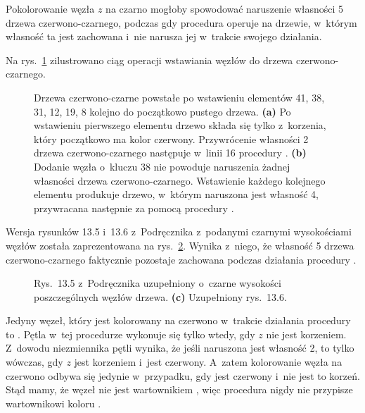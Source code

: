 
\exercise %
Pokolorowanie węzła $z$ na czarno mogłoby spowodować naruszenie własności 5 drzewa czerwono-czarnego, podczas gdy procedura  operuje na drzewie, w~którym własność ta jest zachowana i~nie narusza jej w~trakcie swojego działania.

\exercise %
Na rys.\ \ref{fig:13.3-2} zilustrowano ciąg operacji wstawiania węzłów do drzewa czerwono-czarnego.
\begin{figure}[!ht]
	\centering 
	\caption{Drzewa czerwono-czarne powstałe po wstawieniu elementów 41, 38, 31, 12, 19, 8 kolejno do początkowo pustego drzewa.
	{\sffamily\bfseries(a)} Po wstawieniu pierwszego elementu drzewo składa się tylko z~korzenia, który początkowo ma kolor czerwony.
	Przywrócenie własności 2 drzewa czerwono-czarnego następuje w~linii 16 procedury .
	{\sffamily\bfseries(b)} Dodanie węzła o~kluczu 38 nie powoduje naruszenia żadnej własności drzewa czerwono-czarnego.
	{\sffamily\bfseries{}} Wstawienie każdego kolejnego elementu produkuje drzewo, w~którym naruszona jest własność 4, przywracana następnie za pomocą procedury .} \label{fig:13.3-2}
\end{figure}

\exercise %
Wersja rysunków 13.5 i~13.6 z~Podręcznika z~podanymi czarnymi wysokościami węzłów została zaprezentowana na rys.\ \ref{fig:13.3-3}.
Wynika z~niego, że własność 5 drzewa czerwono-czarnego faktycznie pozostaje zachowana podczas działania procedury .
\begin{figure}[!ht]
	\centering 
	\caption{{\sffamily\bfseries{}} Rys.\ 13.5 z~Podręcznika uzupełniony o~czarne wysokości poszczególnych węzłów drzewa.
	{\sffamily\bfseries(c)} Uzupełniony rys.\ 13.6.} \label{fig:13.3-3}
\end{figure}

\exercise %
Jedyny węzeł, który jest kolorowany na czerwono w~trakcie działania procedury  to .
Pętla  w~tej procedurze wykonuje się tylko wtedy, gdy $z$ nie jest korzeniem.
Z~dowodu niezmiennika pętli  wynika, że jeśli naruszona jest własność 2, to tylko wówczas, gdy $z$ jest korzeniem i~jest czerwony.
A~zatem kolorowanie węzła  na czerwono odbywa się jedynie w~przypadku, gdy  jest czerwony i~nie jest to korzeń.
Stąd mamy, że węzeł  nie jest wartownikiem , więc procedura  nigdy nie przypisze wartownikowi koloru .

